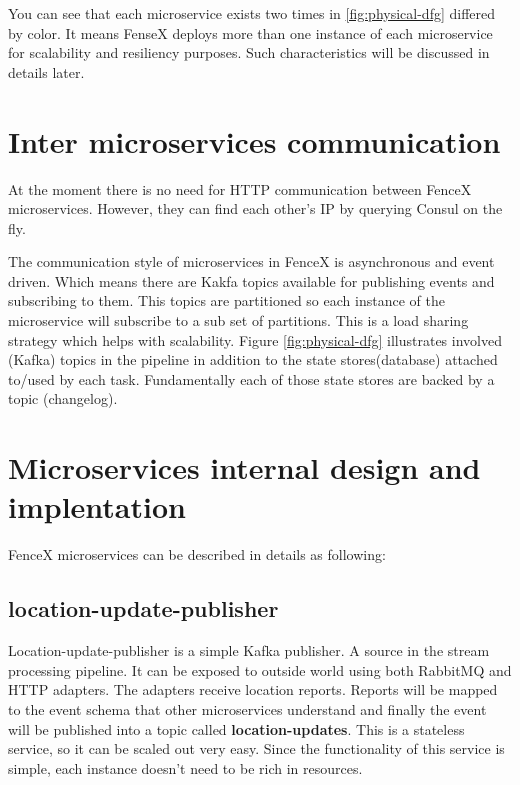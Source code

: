 \documentclass[a4]{report}
\begin{document}
    You can see that each microservice exists two times in \ref{fig:physical-dfg} differed by color.
    It means FenseX deploys more than one instance of each microservice for scalability and resiliency purposes.
    Such characteristics will be discussed in details later.


    \section{Inter microservices communication}
    At the moment there is no need for HTTP communication between FenceX microservices.
    However, they can find each other's IP by querying Consul\cite{Consul} on the fly.

    The communication style of microservices in FenceX is asynchronous and event driven.
    Which means there are Kakfa topics available for publishing events and subscribing to them.
    This topics are partitioned so each instance of the microservice will subscribe to a sub set of partitions.
    This is a load sharing strategy which helps with scalability.
    Figure \ref{fig:physical-dfg} illustrates involved (Kafka) topics in the pipeline in addition to the state
    stores(database) attached to/used by each task.
    Fundamentally each of those state stores are backed by a topic (changelog).


    \section{Microservices internal design and implentation}
    FenceX microservices can be described in details as following:

    \subsection{location-update-publisher}
    Location-update-publisher is a simple Kafka publisher.
    A source in the stream processing pipeline.
    It can be exposed to outside world using both RabbitMQ and HTTP adapters.
    The adapters receive location reports.
    Reports will be mapped to the event schema that other microservices
    understand and finally the event will be published into a topic called \textbf{location-updates}.
    This is a stateless service, so it can be scaled out very easy.
    Since the functionality of this service is simple, each instance doesn't need to be rich in resources.
\end{document}
